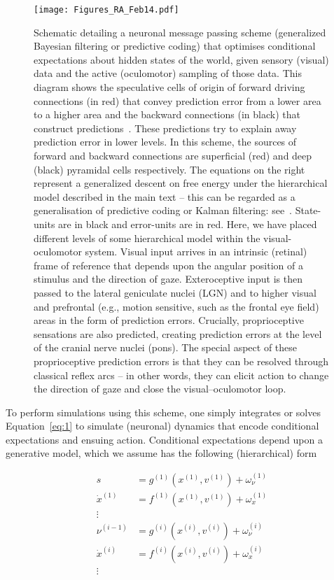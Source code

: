 \documentclass[a4paper]{article} %
\begin{document}
\begin{figure}%
\centerline{%
\texttt{[image: Figures\_RA\_Feb14.pdf]}  
}%
\caption{Schematic detailing a neuronal message passing scheme
(generalized Bayesian filtering or predictive coding) that optimises
conditional expectations about hidden states of the world, given sensory
(visual) data and the active (oculomotor) sampling of those data. This
diagram shows the speculative cells of origin of forward driving
connections (in red) that convey prediction error from a lower area to a
higher area and the backward connections (in black) that construct
predictions~\citep{Mumford92}. These predictions try to explain away
prediction error in lower levels. In this scheme, the sources of forward
and backward connections are superficial (red) and deep (black)
pyramidal cells respectively. The equations on the right represent a
generalized descent on free energy under the hierarchical model
described in the main text -- this can be regarded as a generalisation
of predictive coding or Kalman filtering: see~\citep{Friston08b}.
State-units are in black and error-units are in red. Here, we have
placed different levels of some hierarchical model within the
visual-oculomotor system. Visual input arrives in an intrinsic (retinal)
frame of reference that depends upon the angular position of a stimulus
and the direction of gaze. Exteroceptive input is then passed to the
lateral geniculate nuclei (LGN) and to higher visual and prefrontal
(e.g., motion sensitive, such as the frontal eye field) areas in the
form of prediction errors. Crucially, proprioceptive sensations are also
predicted, creating prediction errors at the level of the cranial nerve
nuclei (pons). The special aspect of these proprioceptive prediction
errors is that they can be resolved through classical reflex arcs -- in
other words, they can elicit action to change the direction of gaze and
close the visual--oculomotor loop.}%
\label{fig:figure2}
\end{figure}

To perform simulations using this scheme, one simply integrates or
solves Equation~\ref{eq:1} to simulate (neuronal) dynamics that encode
conditional expectations and ensuing action. Conditional expectations
depend upon a generative model, which we assume has the following
(hierarchical) form

\begin{align}
s &= g^{(1)}(x^{(1)}, v^{(1)}) + \omega^{(1)}_\nu \nonumber \\%
\dot{x}^{(1)} &= f^{(1)}(x^{(1)}, v^{(1)}) + \omega_x^{(1)}  \nonumber  \\%
\vdots  \label{eq:2} \\%
\nu^{(i-1)} &= g^{(i)}(x^{(i)}, v^{(i)}) + \omega^{(i)}_\nu \nonumber \\%
\dot{x}^{(i)} &= f^{(i)}(x^{(i)}, v^{(i)}) + \omega_x^{(i)}  \nonumber  \\%
\vdots \nonumber  %
\end{align}%
\end{document}
